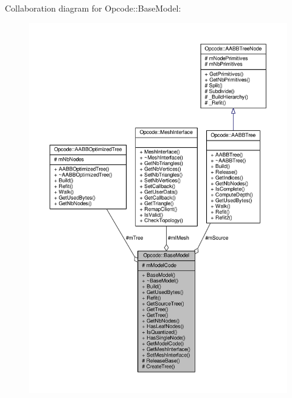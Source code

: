 Collaboration diagram for Opcode\+:\+:Base\+Model\+:
\nopagebreak
\begin{figure}[H]
\begin{center}
\leavevmode
\includegraphics[width=350pt]{d2/d5b/classOpcode_1_1BaseModel__coll__graph}
\end{center}
\end{figure}
